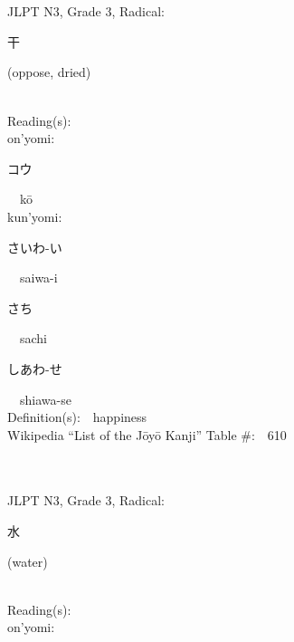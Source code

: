 \begin{multicols}{2}
\ \ \\
{\fontsize{34pt}{40pt}  }\ \ \\  %
{JLPT N3, Grade 3, Radical:\ \ {\begin{CJK}{UTF8}{min} 干 \end{CJK}} (oppose, dried) } \\
Reading(s):\ \ \\
{\hspace*{1em}}on'yomi:\ \ \\
{\hspace*{2em}}{\begin{CJK}{UTF8}{min} コウ \end{CJK}}\ \ k\=o\ \ \\
{\hspace*{1em}}kun'yomi:\ \ \\
{\hspace*{2em}}{\begin{CJK}{UTF8}{min} さいわ-い \end{CJK}}\ \ saiwa-i\ \ \\
{\hspace*{2em}}{\begin{CJK}{UTF8}{min} さち \end{CJK}}\ \ sachi\ \ \\
{\hspace*{2em}}{\begin{CJK}{UTF8}{min} しあわ-せ \end{CJK}}\ \ shiawa-se\ \ \\
Definition(s):\ \ happiness \\
Wikipedia ``List of the J\=oy\=o Kanji'' Table \#:\ \ 610 \\
\ \ \\
{\fontsize{34pt}{40pt}  }\ \ \\  %
{JLPT N3, Grade 3, Radical:\ \ {\begin{CJK}{UTF8}{min} 水 \end{CJK}} (water) } \\
Reading(s):\ \ \\
{\hspace*{1em}}on'yomi:\ \ \\

\end{multicols}
